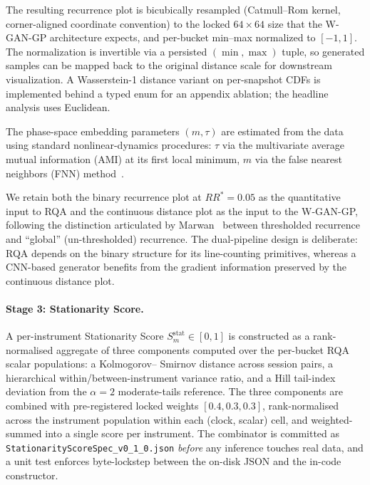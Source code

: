 The resulting recurrence plot is bicubically resampled
(Catmull--Rom kernel, corner-aligned coordinate convention) to the
locked $64 \times 64$ size that the W-GAN-GP architecture expects,
and per-bucket min--max normalized to $[-1, 1]$. The normalization is
invertible via a persisted $(\min, \max)$ tuple, so generated samples
can be mapped back to the original distance scale for downstream
visualization. A Wasserstein-1 distance variant on per-snapshot CDFs
is implemented behind a typed enum for an appendix ablation; the
headline analysis uses Euclidean.

The phase-space embedding parameters $(m, \tau)$ are estimated from
the data using standard nonlinear-dynamics procedures: $\tau$ via the
multivariate average mutual information (AMI) at its first local
minimum, $m$ via the false nearest neighbors (FNN)
method~\cite{kennel1992}.

We retain both the binary recurrence plot at $RR^{*} = 0.05$ as the
quantitative input to RQA and the continuous distance plot as the
input to the W-GAN-GP, following the distinction articulated by
Marwan~\cite{marwan2008} between thresholded recurrence and ``global''
(un-thresholded) recurrence. The dual-pipeline design is deliberate:
RQA depends on the binary structure for its line-counting primitives,
whereas a CNN-based generator benefits from the gradient information
preserved by the continuous distance plot.

\paragraph{Stage 3: Stationarity Score.}
A per-instrument Stationarity Score $S^{\text{stat}}_m \in [0,1]$ is
constructed as a rank-normalised aggregate of three components
computed over the per-bucket RQA scalar populations: a Kolmogorov–
Smirnov distance across session pairs, a hierarchical
within/between-instrument variance ratio, and a Hill tail-index
deviation from the $\alpha = 2$ moderate-tails reference. The three
components are combined with pre-registered locked weights
$[0.4, 0.3, 0.3]$, rank-normalised across the instrument population
within each (clock, scalar) cell, and weighted-summed into a single
score per instrument. The combinator is committed as
\texttt{StationarityScoreSpec\_v0\_1\_0.json} \emph{before} any
inference touches real data, and a unit test enforces byte-lockstep
between the on-disk JSON and the in-code constructor.

